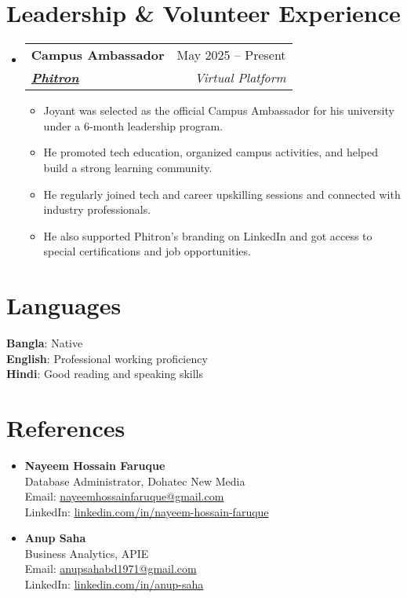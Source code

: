 \documentclass[a4paper, 11pt]{article}
\newcommand{\resumeItem}[1]{
  \item\small{
    {#1 \vspace{-2pt}}
  }
}
\newcommand{\resumeSubheading}[5]{
  \vspace{-2pt}\item
    \begin{tabularx}{\textwidth}[t]{X r}
      \textbf{#1} & #2 \\
      \textbf{\textit{\href{#3}{\small #4}}} & \textit{\small #5} \\
    \end{tabularx}\vspace{-7pt}
}
\newcommand{\resumeSubHeadingListStart}{\begin{itemize}[leftmargin=0in, label={}]}
\newcommand{\resumeSubHeadingListEnd}{\end{itemize}}
\newcommand{\resumeItemListStart}{\begin{itemize}}
\newcommand{\resumeItemListEnd}{\end{itemize}\vspace{-5pt}}
\begin{document}
\section{\textbf{Leadership \& Volunteer Experience}}
    \resumeSubHeadingListStart
        \resumeSubheading
            {Campus Ambassador}{May 2025 -- Present}
            {https://phitron.io/}{Phitron}{Virtual Platform}
        \resumeItemListStart
            \resumeItem{Joyant was selected as the official Campus Ambassador for his university under a 6-month leadership program.}
            \resumeItem{He promoted tech education, organized campus activities, and helped build a strong learning community.}
            \resumeItem{He regularly joined tech and career upskilling sessions and connected with industry professionals.}
            \resumeItem{He also supported Phitron’s branding on LinkedIn and got access to special certifications and job opportunities.}
        \resumeItemListEnd
    \resumeSubHeadingListEnd

\section{\textbf{Languages}}
  \begin{itemize}[leftmargin=0in, label={}]
    \small{\item{
      \textbf{Bangla}{: Native} \\
      \textbf{English}{: Professional working proficiency} \\
      \textbf{Hindi}{: Good reading and speaking skills}
    }}
  \end{itemize}

\section{\textbf{References}}
    \begin{itemize}[leftmargin=0in, label={}]
    \item \small{
        \textbf{Nayeem Hossain Faruque} \\
        Database Administrator, Dohatec New Media \\
        Email:  \href{mailto:nayeemhossainfaruque@gmail.com}{nayeemhossainfaruque@gmail.com} \\
        LinkedIn:  \href{https://www.linkedin.com/in/nayeem-hossain-faruque-4a3865294/}{linkedin.com/in/nayeem-hossain-faruque}\\
    }
    \vspace{5pt}
    \item \small{
        \textbf{Anup Saha} \\
        Business Analytics, APIE \\
        Email:  \href{mailto:anupsahabd1971@gmail.com}{anupsahabd1971@gmail.com}\\
        LinkedIn: \href{https://www.linkedin.com/in/anup-saha-31589816a/}{linkedin.com/in/anup-saha} \\
    }
    \end{itemize}
\end{document}
